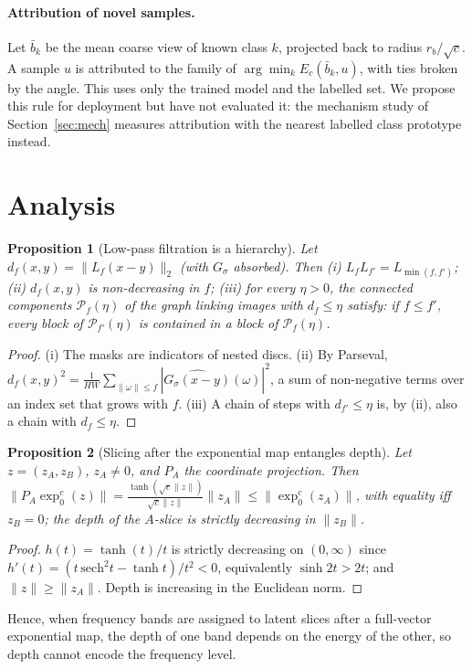 \documentclass[10pt]{article}
\newtheorem{proposition}{Proposition}
\begin{document}
\paragraph{Attribution of novel samples.}\label{sec:attr} Let $\bar b_k$ be the mean coarse view of known
class $k$, projected back to radius $r_b/\sqrt c$. A sample $u$ is attributed to the family of
$\arg\min_k E_c(\bar b_k,u)$, with ties broken by the angle. This uses only the trained model and the labelled
set. We propose this rule for deployment but have not evaluated it: the mechanism study of
Section~\ref{sec:mech} measures attribution with the nearest labelled class prototype instead.

\section{Analysis}\label{sec:analysis}
\begin{proposition}[Low-pass filtration is a hierarchy]\label{prop:filtration}
Let $d_f(x,y)=\|L_f(x-y)\|_2$ (with $G_\sigma$ absorbed). Then (i) $L_fL_{f'}=L_{\min(f,f')}$;
(ii) $d_f(x,y)$ is non-decreasing in $f$; (iii) for every $\eta>0$, the connected components
$\mathcal{P}_f(\eta)$ of the graph linking images with $d_f\le\eta$ satisfy: if $f\le f'$, every block of
$\mathcal{P}_{f'}(\eta)$ is contained in a block of $\mathcal{P}_f(\eta)$.
\end{proposition}
\begin{proof}
(i) The masks are indicators of nested discs. (ii) By Parseval,
$d_f(x,y)^2=\frac{1}{HW}\sum_{\|\omega\|\le f}|\widehat{G_\sigma(x-y)}(\omega)|^2$, a sum of non-negative terms over
an index set that grows with $f$. (iii) A chain of steps with $d_{f'}\le\eta$ is, by (ii), also a chain with
$d_f\le\eta$.
\end{proof}

\begin{proposition}[Slicing after the exponential map entangles depth]\label{prop:slice}
Let $z=(z_A,z_B)$, $z_A\neq 0$, and $P_A$ the coordinate projection. Then
$\|P_A\exp_0^c(z)\|=\frac{\tanh(\sqrt{c}\|z\|)}{\sqrt{c}\|z\|}\|z_A\|\le\|\exp_0^c(z_A)\|$, with equality iff
$z_B=0$; the depth of the $A$-slice is strictly decreasing in $\|z_B\|$.
\end{proposition}
\begin{proof}
$h(t)=\tanh(t)/t$ is strictly decreasing on $(0,\infty)$ since $h'(t)=(t\,\mathrm{sech}^2t-\tanh t)/t^2<0$,
equivalently $\sinh 2t>2t$; and $\|z\|\ge\|z_A\|$. Depth is increasing in the Euclidean norm.
\end{proof}
Hence, when frequency bands are assigned to latent slices after a full-vector exponential map, the depth of one
band depends on the energy of the other, so depth cannot encode the frequency level.
\end{document}
